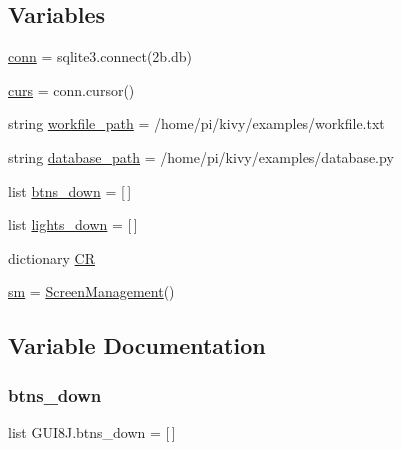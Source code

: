 \subsection*{Variables}
\begin{DoxyCompactItemize}
\item 
\hyperlink{namespaceGUI8J_a4f927d4b54f7b5b67d51112e98813280}{conn} = sqlite3.\+connect(\textquotesingle{}2b.\+db\textquotesingle{})
\item 
\hyperlink{namespaceGUI8J_a9071a3df4f37ae26036b57996e85e7e3}{curs} = conn.\+cursor()
\item 
string \hyperlink{namespaceGUI8J_a6c128a58943c04cd4b39ab866e932cb5}{workfile\+\_\+path} = \textquotesingle{}/home/pi/kivy/examples/workfile.\+txt\textquotesingle{}
\item 
string \hyperlink{namespaceGUI8J_a449cfb95e6ef7bad59eca585bbdbc070}{database\+\_\+path} = \textquotesingle{}/home/pi/kivy/examples/database.\+py\textquotesingle{}
\item 
list \hyperlink{namespaceGUI8J_aeb10edc27f00ab3a8ac6b9bd371825d8}{btns\+\_\+down} = \mbox{[}$\,$\mbox{]}
\item 
list \hyperlink{namespaceGUI8J_a974cb7ffd4fb84577faa81105a676fe6}{lights\+\_\+down} = \mbox{[}$\,$\mbox{]}
\item 
dictionary \hyperlink{namespaceGUI8J_a22559156071a0e55de6499cb7c11bc13}{CR}
\item 
\hyperlink{namespaceGUI8J_adcbadd2e4d3eb82dc0f961f439e9b394}{sm} = \hyperlink{classGUI8J_1_1ScreenManagement}{Screen\+Management}()
\end{DoxyCompactItemize}


\subsection{Variable Documentation}
\mbox{\label{namespaceGUI8J_aeb10edc27f00ab3a8ac6b9bd371825d8}} 
\subsubsection{\texorpdfstring{btns\+\_\+down}{btns\_down}}
{\footnotesize\ttfamily list G\+U\+I8\+J.\+btns\+\_\+down = \mbox{[}$\,$\mbox{]}}

\mbox{\label{namespaceGUI8J_a4f927d4b54f7b5b67d51112e98813280}} 
